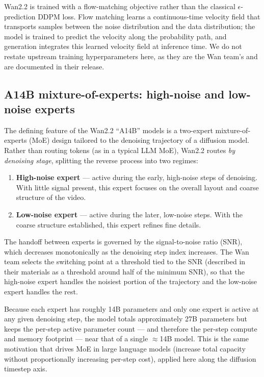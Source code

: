 \documentclass[11pt,a4paper]{article}
\begin{document}
Wan2.2 is trained with a flow-matching objective rather than the classical $\epsilon$-prediction DDPM loss. Flow matching learns a continuous-time velocity field that transports samples between the noise distribution and the data distribution; the model is trained to predict the velocity along the probability path, and generation integrates this learned velocity field at inference time. We do not restate upstream training hyperparameters here, as they are the Wan team's and are documented in their release.

\subsection{A14B mixture-of-experts: high-noise and low-noise experts}

The defining feature of the Wan2.2 ``A14B'' models is a two-expert mixture-of-experts (MoE) design tailored to the denoising trajectory of a diffusion model. Rather than routing tokens (as in a typical LLM MoE), Wan2.2 routes \emph{by denoising stage}, splitting the reverse process into two regimes:

\begin{enumerate}
  \item \textbf{High-noise expert} --- active during the early, high-noise steps of denoising. With little signal present, this expert focuses on the overall layout and coarse structure of the video.
  \item \textbf{Low-noise expert} --- active during the later, low-noise steps. With the coarse structure established, this expert refines fine details.
\end{enumerate}

The handoff between experts is governed by the signal-to-noise ratio (SNR), which decreases monotonically as the denoising step index increases. The Wan team selects the switching point at a threshold tied to the SNR (described in their materials as a threshold around half of the minimum SNR), so that the high-noise expert handles the noisiest portion of the trajectory and the low-noise expert handles the rest.

Because each expert has roughly 14B parameters and only one expert is active at any given denoising step, the model totals approximately 27B parameters but keeps the per-step active parameter count --- and therefore the per-step compute and memory footprint --- near that of a single $\approx$14B model. This is the same motivation that drives MoE in large language models (increase total capacity without proportionally increasing per-step cost), applied here along the diffusion timestep axis.
\end{document}
